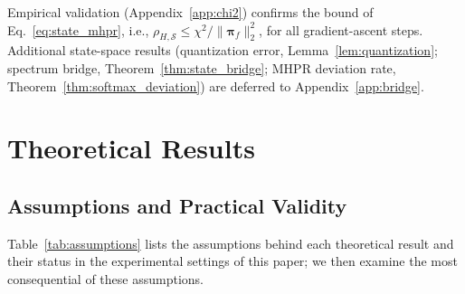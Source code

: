 \documentclass[smallextended]{svjour3}       %
\begin{document}
Empirical validation (Appendix~\ref{app:chi2}) confirms the bound of Eq.~\eqref{eq:state_mhpr}, i.e., $\rho_{H,\mathcal{S}} \le \chi^2/\|\boldsymbol{\pi}_f\|_2^2$, for all gradient-ascent steps. Additional state-space results (quantization error, Lemma~\ref{lem:quantization}; spectrum bridge, Theorem~\ref{thm:state_bridge}; MHPR deviation rate, Theorem~\ref{thm:softmax_deviation}) are deferred to Appendix~\ref{app:bridge}.

\section{Theoretical Results}
\label{sec:theory}

\subsection{Assumptions and Practical Validity}
\label{sec:assumptions}

Table~\ref{tab:assumptions} lists the assumptions behind each theoretical result and their status in the experimental settings of this paper; we then examine the most consequential of these assumptions.
\end{document}

